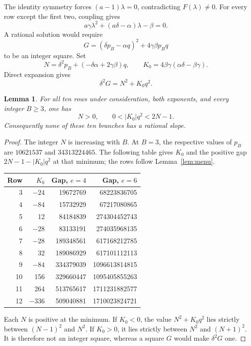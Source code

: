 \documentclass[11pt,a4paper]{article}
\newtheorem{lemma}[theorem]{Lemma}
\begin{document}
The identity symmetry forces $(a-1)\lambda=0$, contradicting
$F(\lambda)\ne0$. For every row except the first two, coupling gives
\[
 a\gamma\lambda^2+(a\delta-\alpha)\lambda-\beta=0.
\]
A rational solution would require
\[
 G=(\delta p_B-\alpha q)^2+4\gamma\beta p_Bq
\]
to be an integer square. Set
\begin{equation}\label{eq:squaregap}
 N=\delta^2p_B+(-\delta\alpha+2\gamma\beta)q,
 \qquad K_0=4\beta\gamma(\alpha\delta-\beta\gamma).
\end{equation}
Direct expansion gives
\[
                           \delta^2G=N^2+K_0q^2.
\]

\begin{lemma}\label{lem:gap}
For all ten rows under consideration, both exponents, and every
integer $B\ge3$, one has
\[
                         N>0,\qquad 0<|K_0|q^2<2N-1.
\]
Consequently none of these ten branches has a rational slope.
\end{lemma}
\begin{proof}
The integer $N$ is increasing with $B$. At $B=3$, the respective
values of $p_B$ are $10621537$ and $34313224465$.
The following table gives $K_0$ and the positive gap
$2N-1-|K_0|q^2$ at that minimum; the rows follow Lemma~\ref{lem:menu}.
\begin{center}
\begin{tabular}{rrrr}\toprule
Row&$K_0$&Gap, $e=4$&Gap, $e=6$\\\midrule
3&$-24$&19672769&68223836705\\
4&$-84$&15732929&67217080865\\
5&12&84184839&274304452743\\
6&$-28$&83133191&274035968135\\
7&$-28$&189348561&617168212785\\
8&32&189086929&617101112113\\
9&$-84$&334379039&1096613814815\\
10&156&329660447&1095405855263\\
11&264&513765617&1711231882577\\
12&$-336$&509040881&1710023824721\\\bottomrule
\end{tabular}
\end{center}
Each $N$ is positive at the minimum. If $K_0<0$, the value
$N^2+K_0q^2$ lies strictly between $(N-1)^2$ and $N^2$.
If $K_0>0$, it lies strictly between $N^2$ and $(N+1)^2$.
It is therefore not an integer square, whereas a square $G$ would
make $\delta^2G$ one.
\end{proof}
\end{document}

